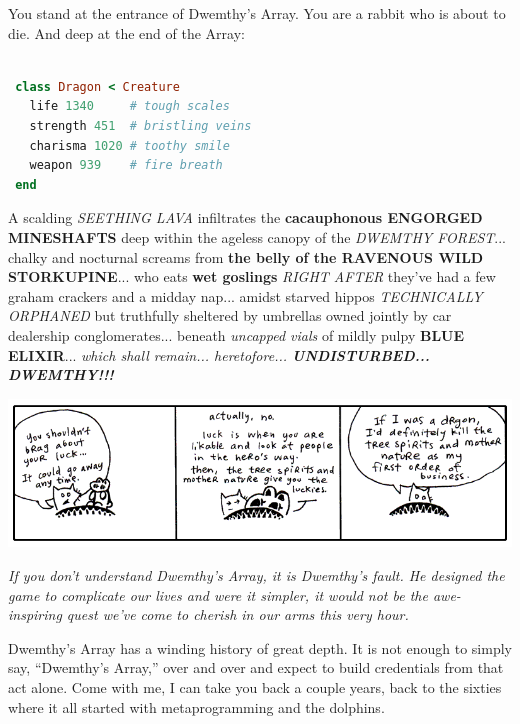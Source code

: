 \documentclass[10pt,twoside]{report}
\begin{document}
You stand at the entrance of Dwemthy's Array.  You are a rabbit who is
about to die. And deep at the end of the Array:


\begin{lstlisting}[basicstyle=\ttfamily\color{basiccolor},
    commentstyle = \ttfamily\color{commentcolor},
    keywordstyle=\ttfamily\color{keywordscolor},
    stringstyle=\color{stringcolor},
    language=Ruby,
    basicstyle=\small\ttfamily,
    showstringspaces=false,
  ]

 class Dragon < Creature
   life 1340     # tough scales
   strength 451  # bristling veins
   charisma 1020 # toothy smile
   weapon 939    # fire breath
 end

\end{lstlisting}


A scalding {\em SEETHING LAVA} infiltrates the {\bf cacauphonous
  ENGORGED MINESHAFTS} deep within the ageless canopy of the {\em
  DWEMTHY FOREST}... chalky and nocturnal screams from {\bf the belly
  of the RAVENOUS WILD STORKUPINE}... who eats {\bf wet goslings} {\em
  RIGHT AFTER} they've had a few graham crackers and a midday
nap... amidst starved hippos {\em TECHNICALLY ORPHANED} but truthfully
sheltered by umbrellas owned jointly by car dealership
conglomerates... beneath {\em uncapped vials} of mildly pulpy {\bf
  BLUE ELIXIR}... {\em which shall remain... heretofore... {\bf
    UNDISTURBED... DWEMTHY!!!}}

	\includegraphics[width=1.0\textwidth]{cache/63.png}

{\em If you don't understand Dwemthy's Array, it is Dwemthy's
  fault. He designed the game to complicate our lives and were it
  simpler, it would not be the awe-inspiring quest we've come to
  cherish in our arms this very hour.}

Dwemthy's Array has a winding history of great depth.  It is not
enough to simply say, ``Dwemthy's Array,'' over and over and expect to
build credentials from that act alone.  Come with me, I can take you
back a couple years, back to the sixties where it all started with
metaprogramming and the dolphins.
\end{document}
